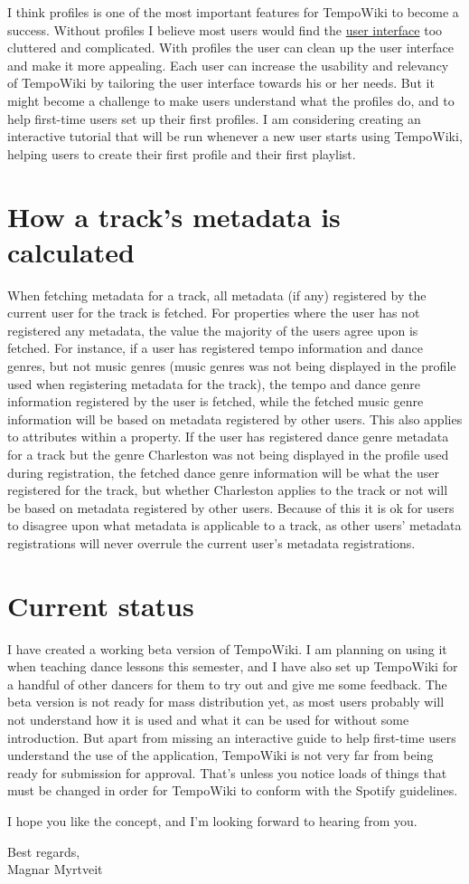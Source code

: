 \documentclass[a4paper, 12pt]{article}
\begin{document}
I think profiles is one of the most important features for TempoWiki to become a success. Without profiles I believe most users would find the \hyperref[sec:user-interface]{user interface} too cluttered and complicated. With profiles the user can clean up the user interface and make it more appealing. Each user can increase the usability and relevancy of TempoWiki by tailoring the user interface towards his or her needs. But it might become a challenge to make users understand what the profiles do, and to help first-time users set up their first profiles. I am considering creating an interactive tutorial that will be run whenever a new user starts using TempoWiki, helping users to create their first profile and their first playlist.
\section{How a track's metadata is calculated}
\label{sec:fetching}
When fetching metadata for a track, all metadata (if any) registered by the current user for the track is fetched. For properties where the user has not registered any metadata, the value the majority of the users agree upon is fetched. For instance, if a user has registered tempo information and dance genres, but not music genres (music genres was not being displayed in the profile used when registering metadata for the track), the tempo and dance genre information registered by the user is fetched, while the fetched music genre information will be based on metadata registered by other users. This also applies to attributes within a property. If the user has registered dance genre metadata for a track but the genre Charleston was not being displayed in the profile used during registration, the fetched dance genre information will be what the user registered for the track, but whether Charleston applies to the track or not will be based on metadata registered by other users. Because of this it is ok for users to disagree upon what metadata is applicable to a track, as other users' metadata registrations will never overrule the current user's metadata registrations.
\section{Current status}
\label{sec:status}
I have created a working beta version of TempoWiki. I am planning on using it when teaching dance lessons this semester, and I have also set up TempoWiki for a handful of other dancers for them to try out and give me some feedback. The beta version is not ready for mass distribution yet, as most users probably will not understand how it is used and what it can be used for without some introduction. But apart from missing an interactive guide to help first-time users understand the use of the application, TempoWiki is not very far from being ready for submission for approval. That's unless you notice loads of things that must be changed in order for TempoWiki to conform with the Spotify guidelines.

I hope you like the concept, and I'm looking forward to hearing from you.

Best regards,\\
Magnar Myrtveit
\end{document}
